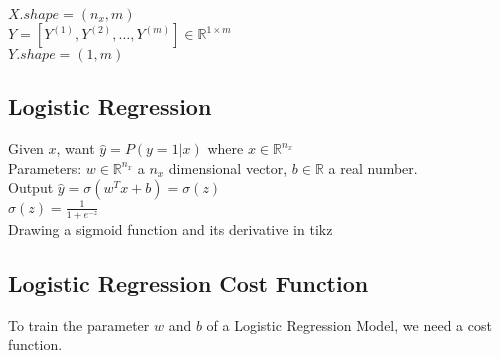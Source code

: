 \documentclass{article}
\begin{document}
    $X.shape = (n_x, m)$\\

    $Y = [Y^{(1)}, Y^{(2)}, \hdots, Y^{(m)}]
    \in \mathbb{R}^{1 \times m}
    $\\

    $Y.shape = (1, m)$\\

\newpage
\subsection{Logistic Regression}

    Given $x$, want $\hat{y} = P(y=1 |x)$ where $x \in \mathbb{R}^{n_x}$\\

    Parameters: $w \in \mathbb{R}^{n_x}$ a $n_x$ dimensional vector, $b \in \mathbb{R}$ a real number.\\

    Output $\hat{y} = \sigma(w^{T}x + b) = \sigma(z)$\\

    $\displaystyle \sigma (z)=\frac {1}{1+e^{-z}}$\\

    Drawing a sigmoid function and its derivative in tikz\\

    \pgfplotsset{compat=1.16}


\newpage
\subsection{Logistic Regression Cost Function}

    To train the parameter $w$ and $b$ of a Logistic Regression Model, we need a cost function.\\
\end{document}
